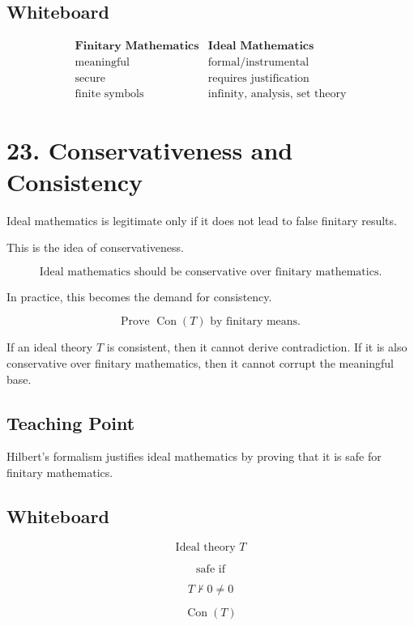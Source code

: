 \documentclass[11pt]{article}
\begin{document}
\subsection*{Whiteboard}

\[
\begin{array}{c|c}
\textbf{Finitary Mathematics} & \textbf{Ideal Mathematics} \\
\hline
\text{meaningful} & \text{formal/instrumental} \\
\text{secure} & \text{requires justification} \\
\text{finite symbols} & \text{infinity, analysis, set theory}
\end{array}
\]

\section*{23. Conservativeness and Consistency}

Ideal mathematics is legitimate only if it does not lead to false finitary results.

This is the idea of conservativeness.

\[
\boxed{
\text{Ideal mathematics should be conservative over finitary mathematics.}
}
\]

In practice, this becomes the demand for consistency.

\[
\boxed{
\text{Prove } \operatorname{Con}(T) \text{ by finitary means.}
}
\]

If an ideal theory \(T\) is consistent, then it cannot derive contradiction. If it is also
conservative over finitary mathematics, then it cannot corrupt the meaningful base.

\subsection*{Teaching Point}

Hilbert's formalism justifies ideal mathematics by proving that it is safe for finitary
mathematics.

\subsection*{Whiteboard}

\[
\text{Ideal theory }T
\]

\[
\text{safe if}
\]

\[
T \nvdash 0 \neq 0
\]

\[
\operatorname{Con}(T)
\]
\end{document}
